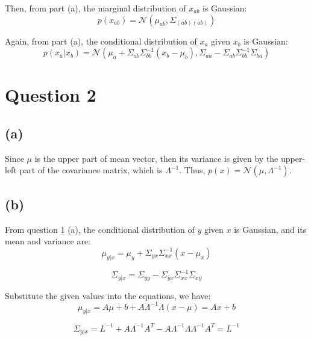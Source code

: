 \documentclass[a4paper,12pt]{article}
\begin{document}
Then, from part (a), the marginal distribution of $x_{ab}$ is Gaussian:
\begin{equation*}
	p(x_{ab}) = \mathcal{N}(\mu_{ab}, \Sigma_{(ab)(ab)})
\end{equation*}

Again, from part (a), the conditional distribution of $x_a$ given $x_b$ is Gaussian:
\begin{equation*}
	p(x_a|x_b) = \mathcal{N}(\mu_a + \Sigma_{ab}\Sigma_{bb}^{-1}(x_b - \mu_b), \Sigma_{aa} - \Sigma_{ab}\Sigma_{bb}^{-1}\Sigma_{ba})
\end{equation*}

\section*{Question 2}

\subsection*{(a)}

Since $\mu$ is the upper part of mean vector, then its variance is given by the upper-left part of the covariance matrix, which is $\Lambda^{-1}$. Thus, $p(x) = \mathcal{N}(\mu, \Lambda^{-1})$.

\subsection*{(b)}

From question 1 (a), the conditional distribution of $y$ given $x$ is Gaussian, and its mean and variance are:
\begin{equation*}
	\mu_{y|x} = \mu_y + \Sigma_{yx}\Sigma_{xx}^{-1}(x - \mu_x)
\end{equation*}

\begin{equation*}
	\Sigma_{y|x} = \Sigma_{yy} - \Sigma_{yx}\Sigma_{xx}^{-1}\Sigma_{xy}
\end{equation*}

Substitute the given values into the equations, we have:
\begin{equation*}
	\mu_{y|x} = A\mu + b + A\Lambda^{-1}\Lambda(x - \mu) = Ax + b
\end{equation*}

\begin{equation*}
	\Sigma_{y|x} = L^{-1} + A\Lambda^{-1}A^T - A\Lambda^{-1}\Lambda\Lambda^{-1}A^T = L^{-1}
\end{equation*}
\end{document}
